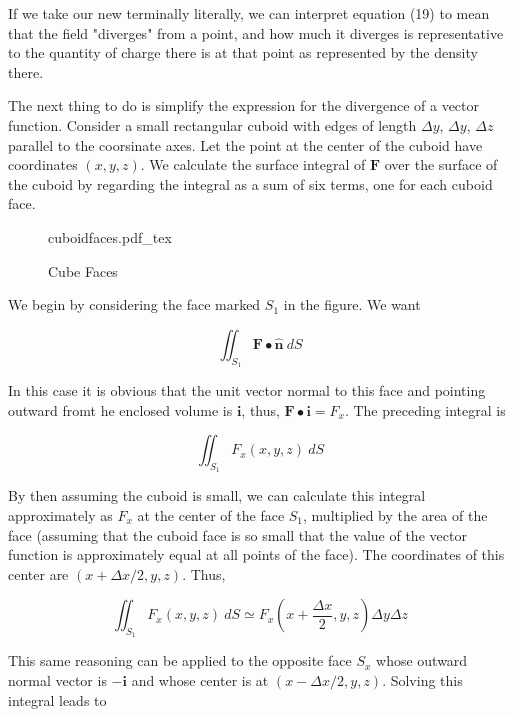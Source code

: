 \documentclass[11pt]{article}
\newcommand{\incfig}[2][1]{%
    \def\svgwidth{#1\columnwidth}
    {#2.pdf_tex}
}
\begin{document}
If we take our new terminally literally, we can interpret equation (19) to mean that the field "diverges" from a point, and how much it diverges is representative to the quantity of charge there is at that point as represented by the density there.

The next thing to do is simplify the expression for the divergence of a vector function. Consider a small rectangular cuboid with edges of length $\Delta y$, $\Delta y$, $\Delta z$ parallel to the coorsinate axes. Let the point at the center of the cuboid have coordinates $(x,y,z)$. We calculate the surface integral of $\mathbf{F}$ over the surface of the cuboid by regarding the integral as a sum of six terms, one for each cuboid face.

\begin{figure}[ht]
    \centering
    \incfig{cuboidfaces}
    \caption{Cube Faces}
    \label{fig:cuboidfaces}
\end{figure}

We begin by considering the face marked $S_1$ in the figure. We want

\begin{equation}
	\iint_{S_1} \mathbf{F} \bullet \mathbf{\hat{n}} \: dS
\end{equation}

In this case it is obvious that the unit vector normal to this face and pointing outward fromt he enclosed volume is $\mathbf{i}$, thus, $\mathbf{F} \bullet \mathbf{i} = F_x$. The preceding integral is

\begin{equation}
	\iint_{S_1} F_x (x,y,z) \: dS
\end{equation}

By then assuming the cuboid is small, we can calculate this integral approximately as $F_x$ at the center of the face $S_1$, multiplied by the area of the face (assuming that the cuboid face is so small that the value of the vector function is approximately equal at all points of the face). The coordinates of this center are $(x + \Delta x /2, y ,z)$. Thus,

\begin{equation}
	\iint_{S_1} F_x (x,y,z) \: dS \simeq F_x (x + \frac{\Delta x}{2}, y, z) \Delta y \Delta z
\end{equation}

This same reasoning can be applied to the opposite face $S_x$ whose outward normal vector is $-\mathbf{i}$ and whose center is at $(x - \Delta x / 2, y, z)$. Solving this integral leads to
\end{document}

